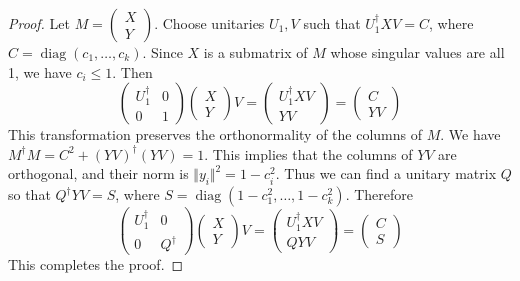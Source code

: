 \documentclass[11pt]{article}
\newcommand{\diag}{\operatorname{diag}}
\begin{document}
\begin{proof}
Let $M = \begin{pmatrix}X \\ Y\end{pmatrix}$. Choose unitaries $U_1, V$ such that $U_1^\dagger X V = C$, where $C = \diag(c_1, \dots, c_k)$. Since $X$ is a submatrix of $M$ whose singular values are all 1, we have $c_i \leq 1$. Then
$$
\begin{pmatrix}U_1^\dagger & 0 \\ 0 & 1\end{pmatrix}\begin{pmatrix}X \\ Y\end{pmatrix}V = \begin{pmatrix}U_1^\dagger X V \\ YV\end{pmatrix} = \begin{pmatrix}C \\ YV\end{pmatrix}
$$
This transformation preserves the orthonormality of the columns of $M$. We have $M^\dagger M = C^2 + (YV)^\dagger (YV)  = 1$. This implies that the columns of $YV$ are orthogonal, and their norm is $\Vert y_i \Vert^2 = 1-c_i^2$. Thus we can find a unitary matrix $Q$ so that $Q^\dagger YV = S$, where $S = \diag(1-c_1^2, \dots, 1-c_k^2)$. Therefore
$$
\begin{pmatrix}U_1^\dagger & 0 \\ 0 & Q^\dagger\end{pmatrix}\begin{pmatrix}X \\ Y\end{pmatrix}V = \begin{pmatrix}U_1^\dagger X V \\ QYV\end{pmatrix} = \begin{pmatrix}C \\ S\end{pmatrix}
$$
This completes the proof.
\end{proof}
\end{document}
